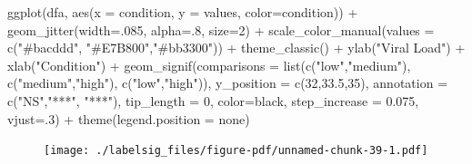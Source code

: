 \documentclass[
  letterpaper,
  DIV=11,
  numbers=noendperiod]{scrreprt}
\newenvironment{Shaded}{\begin{snugshade}}{\end{snugshade}}
\newcommand{\AttributeTok}[1]{\textcolor[rgb]{0.40,0.45,0.13}{#1}}
\newcommand{\DecValTok}[1]{\textcolor[rgb]{0.68,0.00,0.00}{#1}}
\newcommand{\FloatTok}[1]{\textcolor[rgb]{0.68,0.00,0.00}{#1}}
\newcommand{\FunctionTok}[1]{\textcolor[rgb]{0.28,0.35,0.67}{#1}}
\newcommand{\NormalTok}[1]{\textcolor[rgb]{0.00,0.23,0.31}{#1}}
\newcommand{\SpecialCharTok}[1]{\textcolor[rgb]{0.37,0.37,0.37}{#1}}
\newcommand{\StringTok}[1]{\textcolor[rgb]{0.13,0.47,0.30}{#1}}
\begin{document}
\begin{Shaded}
\begin{Highlighting}[]
\FunctionTok{ggplot}\NormalTok{(dfa, }
       \FunctionTok{aes}\NormalTok{(}\AttributeTok{x =}\NormalTok{ condition, }\AttributeTok{y =}\NormalTok{ values, }\AttributeTok{color=}\NormalTok{condition)) }\SpecialCharTok{+}
\FunctionTok{geom\_jitter}\NormalTok{(}\AttributeTok{width=}\NormalTok{.}\DecValTok{085}\NormalTok{, }\AttributeTok{alpha=}\NormalTok{.}\DecValTok{8}\NormalTok{, }\AttributeTok{size=}\DecValTok{2}\NormalTok{) }\SpecialCharTok{+}
  \FunctionTok{scale\_color\_manual}\NormalTok{(}\AttributeTok{values =} \FunctionTok{c}\NormalTok{(}\StringTok{"\#bacddd"}\NormalTok{, }\StringTok{"\#E7B800"}\NormalTok{,}\StringTok{"\#bb3300"}\NormalTok{)) }\SpecialCharTok{+}
  \FunctionTok{theme\_classic}\NormalTok{() }\SpecialCharTok{+}
  \FunctionTok{ylab}\NormalTok{(}\StringTok{"Viral Load"}\NormalTok{) }\SpecialCharTok{+}
  \FunctionTok{xlab}\NormalTok{(}\StringTok{"Condition"}\NormalTok{) }\SpecialCharTok{+}
  \FunctionTok{geom\_signif}\NormalTok{(}\AttributeTok{comparisons =} \FunctionTok{list}\NormalTok{(}\FunctionTok{c}\NormalTok{(}\StringTok{"low"}\NormalTok{,}\StringTok{"medium"}\NormalTok{),}
                                 \FunctionTok{c}\NormalTok{(}\StringTok{"medium"}\NormalTok{,}\StringTok{"high"}\NormalTok{),}
                                 \FunctionTok{c}\NormalTok{(}\StringTok{"low"}\NormalTok{,}\StringTok{"high"}\NormalTok{)),}
              \AttributeTok{y\_position =} \FunctionTok{c}\NormalTok{(}\DecValTok{32}\NormalTok{,}\FloatTok{33.5}\NormalTok{,}\DecValTok{35}\NormalTok{),}
              \AttributeTok{annotation =} \FunctionTok{c}\NormalTok{(}\StringTok{"NS"}\NormalTok{,}\StringTok{"***"}\NormalTok{, }\StringTok{"***"}\NormalTok{),}
              \AttributeTok{tip\_length =} \DecValTok{0}\NormalTok{,}
              \AttributeTok{color=}\StringTok{\textquotesingle{}black\textquotesingle{}}\NormalTok{,}
              \AttributeTok{step\_increase =} \FloatTok{0.075}\NormalTok{,}
              \AttributeTok{vjust=}\NormalTok{.}\DecValTok{3}\NormalTok{) }\SpecialCharTok{+}
  \FunctionTok{theme}\NormalTok{(}\AttributeTok{legend.position =} \StringTok{\textquotesingle{}none\textquotesingle{}}\NormalTok{)}
\end{Highlighting}
\end{Shaded}

\begin{figure}[H]

{\centering \texttt{[image: ./labelsig\_files/figure-pdf/unnamed-chunk-39-1.pdf]}

}

\end{figure}
\end{document}
